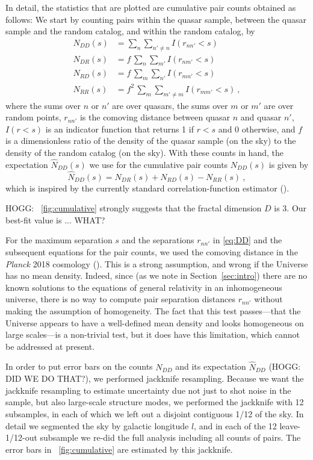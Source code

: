 \documentclass[modern]{aastex631}
\newcommand{\sectionname}{Section}
\newcommand{\secref}[1]{\sectionname~\ref{#1}}
\newcommand{\figref}[1]{\figurename~\ref{#1}}
\begin{document}
In detail, the statistics that are plotted are cumulative pair counts obtained as follows:
We start by counting pairs within the quasar sample, between the quasar sample and the random catalog, and within the random catalog, by
\begin{align}\label{eq:DD}
    N_{DD}(s) &= \sum_n \sum_{n'\ne n} I(r_{nn'} < s) \\
    N_{DR}(s) &= f\,\sum_n \sum_{m'} I(r_{nm'} < s) \\
    N_{RD}(s) &= f\,\sum_m \sum_{n'} I(r_{mn'} < s) \\
    N_{RR}(s) &= f^2\,\sum_m \sum_{m'\ne m} I(r_{mm'} < s)\label{eq:RR} ~,
\end{align}
where the sums over $n$ or $n'$ are over quasars,
the sums over $m$ or $m'$ are over random points,
$r_{nn'}$ is the comoving distance between quasar $n$ and quasar $n'$,
$I(r<s)$ is an indicator function that returns 1 if $r<s$ and 0 otherwise,
and $f$ is a dimensionless ratio of the density of the quasar sample (on the sky) to the density of the random catalog (on the sky).
With these counts in hand, the expectation $\hat{N}_{DD}(s)$ we use for the cumulative pair counts $N_{DD}(s)$ is given by
\begin{equation}\label{eq:DDhat}
    \hat{N}_{DD}(s) = N_{DR}(s) + N_{RD}(s) - N_{RR}(s) ~,
\end{equation}
which is inspired by the currently standard correlation-function estimator (\citealt{ls}).

HOGG: \figref{fig:cumulative} strongly suggests that the fractal dimension $D$ is 3.
Our best-fit value is ... WHAT?

For the maximum separation $s$ and the separations $r_{nn'}$ in \eqref{eq:DD} and the subsequent equations for the pair counts, we used the comoving distance in the \textsl{Planck} 2018 cosmology (\citealt{planck18}).
This is a strong assumption, and wrong if the Universe has no mean density.
Indeed, since (as we note in \secref{sec:intro}) there are no known solutions to the equations of general relativity in an inhomogeneous universe, there is no way to compute pair separation distances $r_{nn'}$ without making the assumption of homogeneity.
The fact that this test passes---that the Universe appears to have a well-defined mean density and looks homogeneous on large scales---is a non-trivial test, but it does have this limitation, which cannot be addressed at present.

In order to put error bars on the counts $N_{DD}$ and its expectation $\hat{N}_{DD}$ (HOGG: DID WE DO THAT?), we performed jackknife resampling.
Because we want the jackknife resampling to estimate uncertainty due not just to shot noise in the sample, but also large-scale structure modes, we performed the jackknife with 12 subsamples, in each of which we left out a disjoint contiguous 1/12 of the sky.
In detail we segmented the sky by galactic longitude $l$, and in each of the 12 leave-1/12-out subsample we re-did the full analysis including all counts of pairs.
The error bars in \figref{fig:cumulative} are estimated by this jackknife.
\end{document}
